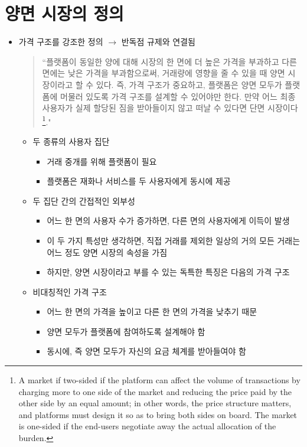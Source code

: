 \section{양면 시장의 정의}\label{sec:}
\begin{itemize}
\item 가격 구조를 강조한 정의 \cite[pp. 664--665]{Rochet:2006jl} $\rightarrow$ 반독점 규제와 연결됨
	\begin{quote}
	``플랫폼이 동일한 양에 대해 시장의 한 면에 더 높은 가격을 부과하고 다른 면에는 낮은 가격을 부과함으로써, 거래량에 영향을 줄 수 있을 때 양면 시장이라고 할 수 있다. 즉, 가격 구조가 중요하고, 플랫폼은 양면 모두가 플랫폼에 머물러 있도록 가격 구조를 설계할 수 있어야만 한다.  만약 어느 최종 사용자가 실제 할당된 짐을 받아들이지 않고 떠날 수 있다면 단면 시장이다\footnote{A market if two-sided if the platform can affect the volume of transactions by charging more to one side of the market and reducing the price paid by the other side by an equal amount; in other words, the price structure matters, and platforms must design it so as to bring both sides on board. The market is one-sided if the end-users negotiate away the actual allocation of the burden.}."
	\end{quote}
	\begin{itemize}
	\item 두 종류의 사용자 집단 
		\begin{itemize}
		\item 거래 중개를 위해 플랫폼이 필요
		\item 플랫폼은 재화나 서비스를 두 사용자에게 동시에 제공
		\end{itemize}
	\item 두 집단 간의 간접적인 외부성
		\begin{itemize}
		\item 어느 한 면의 사용자 수가 증가하면, 다른 면의 사용자에게 이득이 발생
		\item 이 두 가지 특성만 생각하면, 직접 거래를 제외한 일상의 거의 모든 거래는 어느 정도 양면 시장의 속성을 가짐
		\item 하지만, 양면 시장이라고 부를 수 있는 독특한 특징은 다음의 가격 구조
		\end{itemize}
	\item 비대칭적인 가격 구조
		\begin{itemize}
		\item 어느 한 면의 가격을 높이고 다른 한 면의 가격을 낮추기 때문
		\item 양면 모두가 플랫폼에 참여하도록 설계해야 함
		\item 동시에, 즉 양면 모두가 자신의 요금 체계를 받아들여야 함
		\end{itemize}
	\end{itemize}
\end{itemize}

